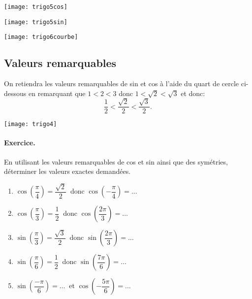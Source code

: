 \documentclass[fontsize=23pt]{scrreprt}%
\newcounter{exercice}
\newcommand{\exo}[1]{%
                     \refstepcounter{exercice}
                     \vspace{1em} \par \noindent
                     \raisebox{-0.7ex}{\textbf{Exercice \no \arabic{exercice}}}
                     \hrulefill\raisebox{-0.7ex}{ \textbf{#1}}
                     \par  \vspace{0.3em} \noindent%
                   }
\begin{document}
\begin{center}
\texttt{[image: trigo5cos]}
\end{center}
\begin{center}
\texttt{[image: trigo5sin]}
\end{center}
\begin{center}
\texttt{[image: trigo6courbe]}
\end{center}
\newpage
\subsection*{Valeurs remarquables}
On retiendra les valeurs remarquables de sin et cos %
à l'aide du quart de cercle ci-dessous en remarquant que $1<2<3$ donc $1<\sqrt2<\sqrt3$ et donc: 
\[\dfrac{1}{2}< \dfrac{\sqrt2}{2}< \dfrac{\sqrt3}{2}.\]
\begin{center}
\texttt{[image: trigo4]}
\end{center}
   
%

\newpage
\paragraph{Exercice.} En utilisant les valeurs  remarquables de cos et sin ainsi que des symétries, déterminer les  valeurs exactes demandées.

\begin{enumerate}
\item  $\cos\left(\dfrac{\pi}{4}\right)=\dfrac{\sqrt2}{2}\ $ donc $\cos\left(-\dfrac{\pi}{4}\right)=\dots$
\item  $\cos\left(\dfrac{\pi}{3}\right)=\dfrac12\ $ donc $\cos\left(\dfrac{2\pi}{3}\right)=\dots$
\item  $\sin\left(\dfrac{\pi}{3}\right)=\dfrac{\sqrt3}{2}\ $ donc $\sin\left(\dfrac{2\pi}{3}\right)=\dots$
\item  $\sin\left(\dfrac{\pi}{6}\right)=\dfrac{1}{2}\ $ donc $\sin\left(\dfrac{7\pi}{6}\right)=\dots$

\item  $\sin\left(\dfrac{-\pi}{6}\right)=\dots\ $ et  $\cos\left(-\dfrac{5\pi}{6}\right)=\dots $
\end{enumerate}
\end{document}
